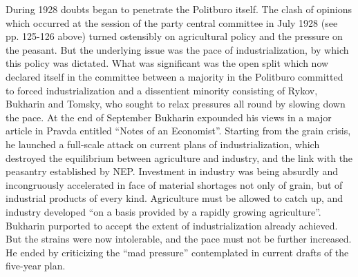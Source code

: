 During 1928 doubts began to penetrate the Politburo itself. The clash of opinions which occurred at the session of the party central committee in July 1928 (see pp. 125-126 above) turned ostensibly on agricultural policy and the pressure on the peasant. But the underlying issue was the pace of industrialization, by which this policy was dictated. What was significant was the open split which now declared itself in the committee between a majority in the Politburo committed to forced industrialization and a dissentient minority consisting of Rykov, Bukharin and Tomsky, who sought to relax pressures all round by slowing down the pace. At the end of September Bukharin expounded his views in a major article in Pravda entitled ``Notes of an Economist''. Starting from the grain crisis, he launched a full-scale attack on current plans of industrialization, which destroyed the equilibrium between agriculture and industry, and the link with the peasantry established by NEP. Investment in industry was being absurdly and incongruously accelerated in face of material shortages not only of grain, but of industrial products of every kind. Agriculture must be allowed to catch up, and industry developed ``on a basis provided by a rapidly growing agriculture''. Bukharin purported to accept the extent of industrialization already achieved. But the strains were now intolerable, and the pace must not be further increased. He ended by criticizing the ``mad pressure'' contemplated in current drafts of the five-year plan. 

